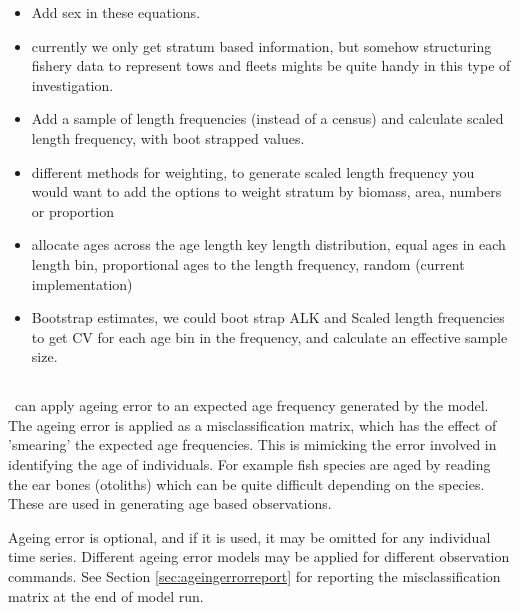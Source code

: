 \begin{itemize}
	\item Add sex in these equations.
	\item currently we only get stratum based information, but somehow structuring fishery data to represent tows and fleets mights be quite handy in this type of investigation.
	\item Add a sample of length frequencies (instead of a census) and calculate scaled length frequency, with boot strapped values.
	\item different methods for weighting, to generate scaled length frequency you would want to add the options to weight stratum by biomass, area, numbers or proportion
	\item allocate ages across the age length key length distribution, equal ages in each length bin, proportional ages to the length frequency, random (current implementation)
	\item Bootstrap estimates, we could boot strap ALK and Scaled length frequencies to get CV for each age bin in the frequency, and calculate an effective sample size.
\end{itemize}



\subsection{}\label{subsec:ageing_error}
\IBM\ can apply ageing error to an expected age frequency generated by the model. The ageing error is applied as a misclassification matrix, which has the effect of 'smearing' the expected age frequencies. This is mimicking the error involved in identifying the age of individuals. For example fish species are aged by reading the ear bones (otoliths) which can be quite difficult depending on the species. These are used in generating age based observations. 

Ageing error is optional, and if it is used, it may be omitted for any individual time series. Different ageing error models may be applied for different observation commands. See Section \ref{sec:ageingerrorreport} for reporting the misclassification matrix at the end of model run.

